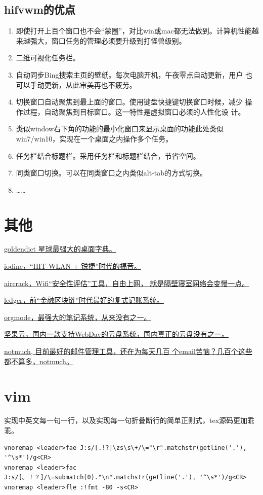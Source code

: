 \subsection{hifvwm的优点}

\begin{enumerate}
	\item 即使打开上百个窗口也不会“蒙圈”，对比win或mac都无法做到。计算机性能越来越强大，窗口任务的管理必须要升级到打怪兽级别。
	\item 二维可视化任务栏。
	\item 自动同步Bing搜索主页的壁纸。每次电脑开机，午夜零点自动更新，用户
		也可以手动更新，从此审美再也不疲劳。
	\item 切换窗口自动聚焦到最上面的窗口。使用键盘快捷键切换窗口时候，减少
		操作过程，自动聚焦到目标窗口。这一特性是虚拟窗口必须的人性化设
		计。
	\item 类似window右下角的功能的最小化窗口来显示桌面的功能此处类似
		win7/win10，实现在一个桌面之内操作多个任务。
	\item 任务栏结合标题栏。采用任务栏和标题栏结合，节省空间。
	\item 同类窗口切换。可以在同类窗口之内类似alt-tab的方式切换。
	\item ……
\end{enumerate}

\section{其他}

\href{https://github.com/goldendict/goldendict}{goldendict 星球最强大的桌面字典。}

\href{https://github.com/yarrick/iodine}{iodine，“HIT-WLAN + 锐捷”时代的福音。}

\href{http://www.aircrack-ng.org/}{aircrack，Wifi“安全性评估”工具，自由上网，
  就是隔壁寝室网络会变慢一点。}

\href{https://www.ledger-cli.org/}{ledger，前“金融区块链”时代最好的复式记账系统。}

\href{https://orgmode.org/}{orgmode，最强大的笔记系统，从来没有之一。}

\href{https://www.jianguoyun.com/}{坚果云，国内一款支持WebDav的云盘系统，国内真正的云盘没有之一。}

\href{https://notmuchmail.org/}{notmuch, 目前最好的邮件管理工具，还在为每天几百
  个email苦恼？几百个这些都不算多，notmuch。}

\section{vim}
实现中英文每一句一行，以及实现每一句折叠断行的简单正则式，tex源码更加乖乖。
\begin{lstlisting}
vnoremap <leader>fae J:s/[.!?]\zs\s\+/\="\r".matchstr(getline('.'), '^\s*')/g<CR>
vnoremap <leader>fac J:s/[。！？]/\=submatch(0)."\n".matchstr(getline('.'), '^\s*')/g<CR>
vnoremap <leader>fle :!fmt -80 -s<CR>
\end{lstlisting}
